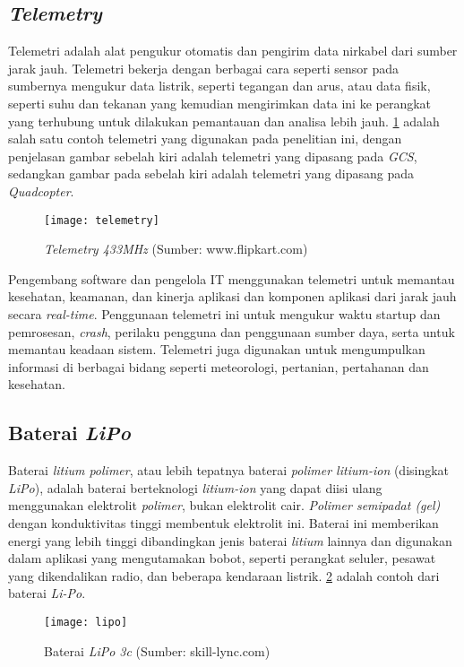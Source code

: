 \subsection{\textit{Telemetry}}
Telemetri adalah alat pengukur otomatis dan pengirim data nirkabel dari sumber jarak jauh. Telemetri bekerja dengan berbagai cara seperti sensor pada sumbernya mengukur data listrik, seperti tegangan dan arus, atau data fisik, seperti suhu dan tekanan yang kemudian mengirimkan data ini ke perangkat yang terhubung untuk dilakukan pemantauan dan analisa lebih jauh. \cref{fig:telemetry} adalah salah satu contoh telemetri yang digunakan pada penelitian ini, dengan penjelasan gambar sebelah kiri adalah telemetri yang dipasang pada \textit{GCS}, sedangkan gambar pada sebelah kiri adalah telemetri yang dipasang pada \textit{Quadcopter}.

\begin{figure}[H]
	\centering
	\texttt{[image: telemetry]}
	\caption{\textit{Telemetry 433MHz} (Sumber: www.flipkart.com)}
	\label{fig:telemetry}
\end{figure}

Pengembang software dan pengelola IT menggunakan telemetri untuk memantau kesehatan, keamanan, dan kinerja aplikasi dan komponen aplikasi dari jarak jauh secara \textit{real-time}. Penggunaan telemetri ini untuk mengukur waktu startup dan pemrosesan, \textit{crash}, perilaku pengguna dan penggunaan sumber daya, serta untuk memantau keadaan sistem. Telemetri juga digunakan untuk mengumpulkan informasi di berbagai bidang seperti meteorologi, pertanian, pertahanan dan kesehatan.


\subsection{Baterai \textit{LiPo}}
Baterai \textit{litium polimer}, atau lebih tepatnya baterai \textit{polimer litium-ion} (disingkat \textit{LiPo}), adalah baterai berteknologi \textit{litium-ion} yang dapat diisi ulang menggunakan elektrolit \textit{polimer}, bukan elektrolit cair. \textit{Polimer semipadat (gel)} dengan konduktivitas tinggi membentuk elektrolit ini. Baterai ini memberikan energi yang lebih tinggi dibandingkan jenis baterai \textit{litium} lainnya dan digunakan dalam aplikasi yang mengutamakan bobot, seperti perangkat seluler, pesawat yang dikendalikan radio, dan beberapa kendaraan listrik. \cref{fig:lipo} adalah contoh dari baterai \textit{Li-Po}.

\begin{figure}[H]
	\centering
	\texttt{[image: lipo]}
	\caption{Baterai \textit{LiPo 3c} (Sumber: skill-lync.com)}
	\label{fig:lipo}
\end{figure}

